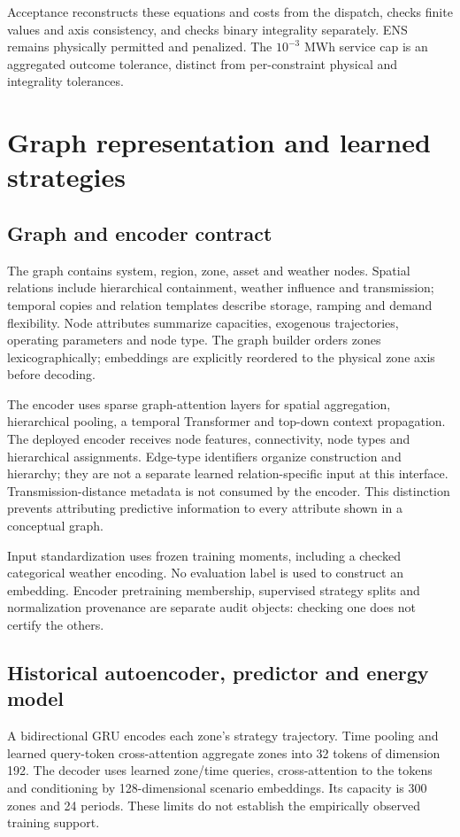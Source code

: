 Acceptance reconstructs these equations and costs from the dispatch, checks
finite values and axis consistency, and checks binary integrality separately.
ENS remains physically permitted and penalized. The $10^{-3}$ MWh service
cap is an aggregated outcome tolerance, distinct from per-constraint physical
and integrality tolerances.

\section{Graph representation and learned strategies}
\label{app:learned}
\subsection{Graph and encoder contract}
The graph contains system, region, zone, asset and weather nodes. Spatial
relations include hierarchical containment, weather influence and transmission;
temporal copies and relation templates describe storage, ramping and demand
flexibility. Node attributes summarize capacities, exogenous trajectories,
operating parameters and node type. The graph builder orders zones
lexicographically; embeddings are explicitly reordered to the physical
zone axis before decoding.

The encoder uses sparse graph-attention layers for spatial aggregation,
hierarchical pooling, a temporal Transformer and top-down context propagation.
The deployed encoder receives node features, connectivity, node types and
hierarchical assignments. Edge-type identifiers organize construction and
hierarchy; they are not a separate learned relation-specific input at this
interface. Transmission-distance metadata is not consumed by the encoder.
This distinction prevents attributing predictive information to every
attribute shown in a conceptual graph.

Input standardization uses frozen training moments, including a checked
categorical weather encoding. No evaluation label is used to construct an
embedding. Encoder pretraining membership, supervised strategy splits and
normalization provenance are separate audit objects: checking one does not
certify the others.

\subsection{Historical autoencoder, predictor and energy model}
A bidirectional GRU encodes each zone's strategy trajectory. Time pooling
and learned query-token cross-attention aggregate zones into 32 tokens of
dimension 192. The decoder uses learned zone/time queries, cross-attention
to the tokens and conditioning by 128-dimensional scenario embeddings. Its
capacity is 300 zones and 24 periods. These limits do not establish the
empirically observed training support.

